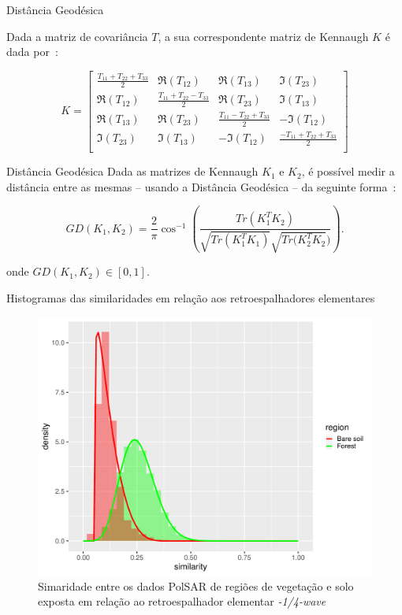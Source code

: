 \documentclass{beamer} %
\begin{document}
\begin{frame}{Distância Geodésica}

Dada a matriz de covariância $T$, a sua correspondente matriz de Kennaugh $K$ é dada por~\cite{ClassificationPolSARGeodesic}:


\scriptsize
\begin{equation}
K =
\begin{bmatrix}
\frac{ T_{11} + T_{22} + T_{33} }{2} & \Re(T_{12}) & \Re(T_{13}) & \Im(T_{23})\\
\Re(T_{12}) & \frac{T_{11} + T_{22} - T_{33}}{2} & \Re(T_{23}) & \Im(T_{13})\\
\Re(T_{13}) & \Re(T_{23}) & \frac{ T_{11} - T_{22} + T_{33} }{2} & -\Im(T_{12})\\
\Im(T_{23}) & \Im(T_{13}) & -\Im(T_{12}) & \frac{ -T_{11} + T_{22} + T_{33} }{2}\\
\end{bmatrix}
\end{equation}

\normalsize
    
\end{frame}

\begin{frame}{Distância Geodésica}
    Dada as matrizes de Kennaugh $K_1$ e $K_2$, é possível medir a distância entre as mesmas -- usando a Distância Geodésica -- da seguinte forma~\cite{ClassificationPolSARGeodesic}:
    
    \begin{equation}
GD(K_1, K_2) = \frac{2}{\pi} \cos^{-1} \left(\frac{Tr(K_1^T K_2)}{\sqrt{Tr(K_1^T K_1)} \sqrt{Tr(K_2^T K_2})} \right).
\end{equation}

onde $GD(K_1, K_2) \in [0,1]$.
    
\end{frame}

\begin{frame}{Histogramas das similaridades em relação aos retroespalhadores elementares}

\begin{figure}
    \centering
    \includegraphics[width = .6\linewidth]{wvn.pdf}
    \caption{Simaridade entre os dados PolSAR de regiões de vegetação e solo exposta em relação ao retroespalhador elementar \textit{-1/4-wave}}
    \label{fig:wvn}
\end{figure}
    
\end{frame}
\end{document}
